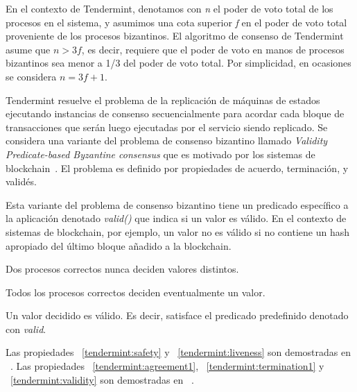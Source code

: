 En el contexto de Tendermint, denotamos con \textit{n} el poder de voto total de los procesos
en el sistema, y asumimos una cota superior \textit{f} en el poder de voto total proveniente de
los procesos bizantinos.
%
El algoritmo de consenso de Tendermint asume que $n > 3f$, es decir, requiere que el poder de voto
en manos de procesos bizantinos sea menor a 1/3 del poder de voto total.
Por simplicidad, en ocasiones se considera $n = 3f + 1$.

Tendermint resuelve el problema de la replicación de máquinas de estados ejecutando instancias de
consenso secuencialmente para acordar cada bloque de transacciones que serán luego ejecutadas por el
servicio siendo replicado.
Se considera una variante del problema de consenso bizantino llamado \textit{Validity Predicate-based Byzantine consensus}
que es motivado por los sistemas de blockchain~\cite{Crain2017LeaderRandomizationSignaturefreeBC}.
El problema es definido por propiedades de acuerdo, terminación, y validés.

Esta variante del problema de consenso bizantino tiene un predicado específico a la aplicación
denotado \textit{valid()} que indica si un valor es válido. En el contexto de sistemas de blockchain, por ejemplo,
un valor no es válido si no contiene un hash apropiado del último bloque añadido a la blockchain.

\begin{property}[Agreement]\label{tendermint:agreement1}
  Dos procesos correctos nunca deciden valores distintos.
\end{property}

\begin{property}[Termination]\label{tendermint:termination1}
    Todos los procesos correctos deciden eventualmente un valor.
\end{property}

\begin{property}[Validity]\label{tendermint:validity}
    Un valor decidido es válido. Es decir, satisface el predicado predefinido
    denotado con \textit{valid}.
\end{property}
%

Las propiedades ~\ref{tendermint:safety} y ~\ref{tendermint:liveness} son demostradas en ~\cite{Kwon2014TendermintC}.
Las propiedades ~\ref{tendermint:agreement1}, ~\ref{tendermint:termination1} y ~\ref{tendermint:validity}
son demostradas en ~\cite{Buchman.2018.Tendermint}.


